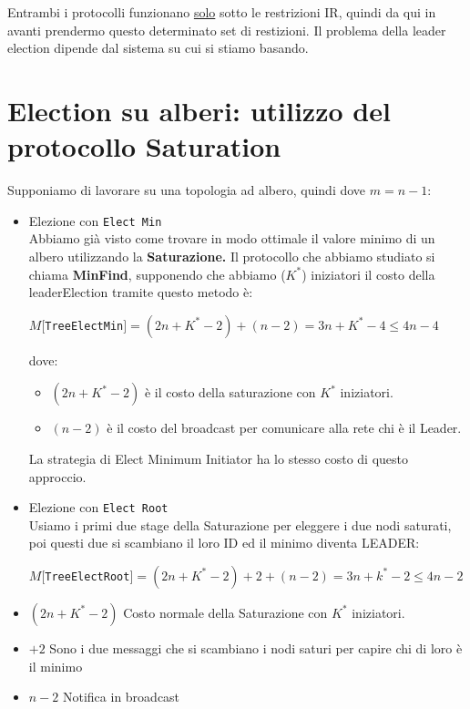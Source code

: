 Entrambi i protocolli funzionano \underline{solo} sotto le restrizioni IR,
quindi da qui in avanti prendermo questo determinato set di restizioni. Il
problema della leader election dipende dal sistema su cui si stiamo basando.

\section{Election su alberi: utilizzo del protocollo Saturation}
Supponiamo di lavorare su una topologia ad albero, quindi dove $m = n-1$:

\begin{itemize}
    \item Elezione con \texttt{Elect Min}\\
          Abbiamo già visto come trovare in modo ottimale il valore minimo di un
          albero utilizzando la \textbf{Saturazione.} Il protocollo che abbiamo
          studiato si chiama \textbf{MinFind}, supponendo che abbiamo ($K^*$)
          iniziatori il costo della leaderElection tramite questo metodo è:
          \begin{center}
              $M[$\texttt{TreeElectMin}$] = (2n + K^* -2) + (n-2) = 3n + K^* - 4
                  \leq 4n - 4$
          \end{center}
          dove:
          \begin{itemize}
              \item $(2n + K^* -2)$ è il costo della saturazione con $K^*$
                    iniziatori.
              \item $(n-2)$ è il costo del broadcast per comunicare alla rete chi è
                    il Leader.
          \end{itemize}

          La strategia di Elect Minimum Initiator ha lo stesso costo di questo
          approccio.
    \item Elezione con \texttt{Elect Root}\\
          Usiamo i primi due stage della Saturazione per eleggere i due nodi
          saturati, poi questi due si scambiano il loro ID ed il minimo diventa
          LEADER:
          \begin{center}
              $M[$\texttt{TreeElectRoot}$] = (2n + K^* -2) +2 + (n-2) = 3n + k^* - 2
                  \leq 4n - 2$
          \end{center}
\end{itemize}
\begin{itemize}
    \item $(2n + K^* -2)$ Costo normale della Saturazione con $K^*$ iniziatori.
    \item $+2$ Sono i due messaggi che si scambiano i nodi saturi per capire chi
          di loro è il minimo
    \item $n-2$ Notifica in broadcast
\end{itemize}


